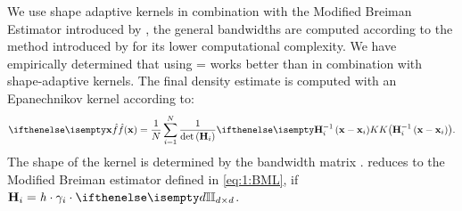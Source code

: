 
	We use shape adaptive kernels in combination with the Modified Breiman Estimator introduced by \textcite{wilkinson1995dataplot},
	the general bandwidths are computed according to the method introduced by \textcite{ferdosi2011comparison} for its lower computational complexity. 
	We have empirically determined that using \varMBESensitivityParam =  works better than  in combination with shape-adaptive kernels.
	The final density estimate is computed with an Epanechnikov kernel according to:
	\begin{equation}\label{eq:2:parzenWithBandWidthMatrix}
		\varEstimatedDensityFunction{\varPattern} = \frac{1}{\varNumPatterns}\sum_{\itXis = 1}^{\varNumPatterns} \frac{1}{\det\left(\varBandwidthMatrix[\itXis]\right)}\varKernel{\varBandwidthMatrix[\itXis]^{-1}\left(\varPattern - \varPattern[\itXis]\right)}.
	\end{equation}
	The shape of the kernel \varKernel{\bullet} is determined by the bandwidth matrix \varBandwidthMatrix[\itXis].  reduces to the Modified Breiman estimator defined in \cref{eq:1:BML}, if $\varBandwidthMatrix[\itXis] = \varBandwidth \cdot \varLocalBandwidth{\itXis} \cdot \identityMatrix{\varDim}$.
	
